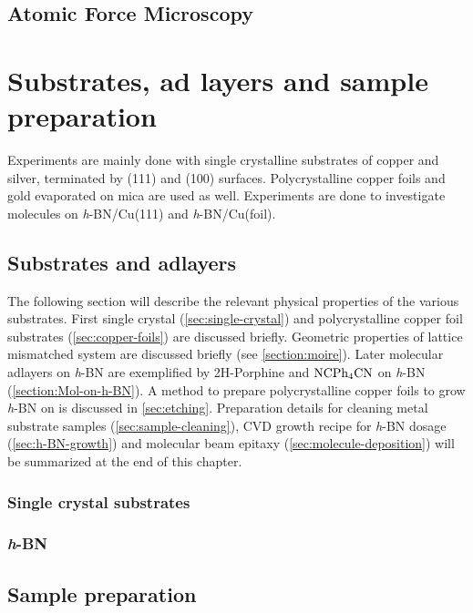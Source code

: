 \documentclass[
twoside,				%
BCOR=12mm,				%
headings=normal,		%
headsepline,			%
footsepline,			%
plainfootsepline,		%
]
{scrbook}
\begin{document}
  \section{\textbf{A}tomic \textbf{F}orce \textbf{M}icroscopy}
  \label{section:afm}
	

\chapter{Substrates, ad layers and sample preparation}
 Experiments are mainly done with single crystalline substrates of copper and silver, terminated by (111) and (100) surfaces. Polycrystalline copper foils and gold evaporated on mica are used as well. Experiments are done to investigate molecules on \textit{h}-BN/Cu(111) and \textit{h}-BN/Cu(foil).
 
  \section{Substrates and adlayers}
The following section will describe the relevant physical properties of the various substrates. First single crystal (\autoref{sec:single-crystal}) and polycrystalline copper foil substrates (\autoref{sec:copper-foils}) are discussed briefly. Geometric properties of lattice mismatched system are discussed briefly (see \autoref{section:moire}). Later molecular adlayers on \textit{h}-BN are exemplified by 2H-Porphine and $\textnormal{NC}\textnormal{Ph}_4\textnormal{CN}$ on \textit{h}-BN (\autoref{section:Mol-on-h-BN}). A method to prepare polycrystalline copper foils to grow \textit{h}-BN on is discussed in \autoref{sec:etching}. Preparation details for cleaning metal substrate samples (\autoref{sec:sample-cleaning}), CVD growth recipe for \textit{h}-BN dosage (\autoref{sec:h-BN-growth}) and molecular beam epitaxy (\autoref{sec:molecule-deposition}) will be summarized at the end of this chapter.

     \subsection{Single crystal substrates}
        

     \subsection{\textit{h}-BN}
		

  \section{Sample preparation}
    
\end{document}
